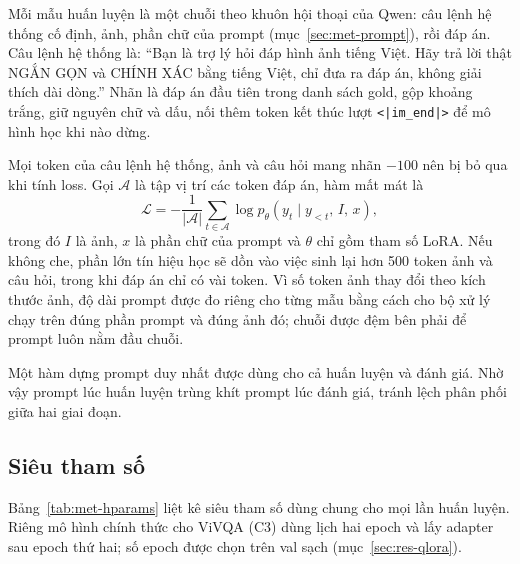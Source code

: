 Mỗi mẫu huấn luyện là một chuỗi theo khuôn hội thoại của Qwen: câu lệnh hệ thống
cố định, ảnh, phần chữ của prompt (mục~\ref{sec:met-prompt}), rồi đáp án. Câu
lệnh hệ thống là: ``Bạn là trợ lý hỏi đáp hình ảnh tiếng Việt. Hãy trả lời thật
NGẮN GỌN và CHÍNH XÁC bằng tiếng Việt, chỉ đưa ra đáp án, không giải thích dài
dòng.'' Nhãn là đáp án đầu tiên trong danh sách gold, gộp khoảng trắng, giữ nguyên
chữ và dấu, nối thêm token kết thúc lượt \texttt{<|im\_end|>} để mô hình học khi
nào dừng.

Mọi token của câu lệnh hệ thống, ảnh và câu hỏi mang nhãn $-100$ nên bị bỏ qua
khi tính loss. Gọi $\mathcal{A}$ là tập vị trí các token đáp án, hàm mất mát là
\begin{equation}
\mathcal{L} = -\frac{1}{|\mathcal{A}|}\sum_{t \in \mathcal{A}} \log p_\theta\left(y_t \mid y_{<t},\, I,\, x\right),
\label{eq:loss}
\end{equation}
trong đó $I$ là ảnh, $x$ là phần chữ của prompt và $\theta$ chỉ gồm tham số LoRA.
Nếu không che, phần lớn tín hiệu học sẽ dồn vào việc sinh lại hơn 500 token ảnh và
câu hỏi, trong khi đáp án chỉ có vài token. Vì số token ảnh thay đổi theo kích
thước ảnh, độ dài prompt được đo riêng cho từng mẫu bằng cách cho bộ xử lý chạy
trên đúng phần prompt và đúng ảnh đó; chuỗi được đệm bên phải để prompt luôn nằm
đầu chuỗi.

Một hàm dựng prompt duy nhất được dùng cho cả huấn luyện và đánh giá. Nhờ vậy
prompt lúc huấn luyện trùng khít prompt lúc đánh giá, tránh lệch phân phối giữa
hai giai đoạn.

\subsection{Siêu tham số}

Bảng~\ref{tab:met-hparams} liệt kê siêu tham số dùng chung cho mọi lần huấn luyện.
Riêng mô hình chính thức cho ViVQA (C3) dùng lịch hai epoch và lấy adapter sau
epoch thứ hai; số epoch được chọn trên val sạch (mục~\ref{sec:res-qlora}).

